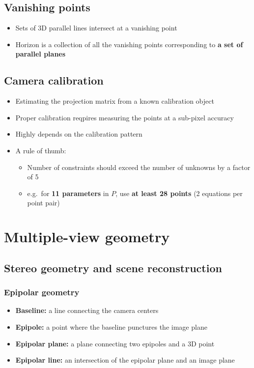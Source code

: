 \documentclass{article}
\begin{document}
    \subsection{Vanishing points}
    \begin{itemize}
        \item Sets of 3D parallel lines intersect at a vanishing point
        \item Horizon is a collection of all the vanishing points corresponding to \textbf{a set of parallel planes}
    \end{itemize}

    \subsection{Camera calibration}
    \begin{itemize}
        \item Estimating the projection matrix from a known calibration object
        \item Proper calibration reqpires measuring the points at a sub-pixel accuracy
        \item Highly depends on the calibration pattern
        \item A rule of thumb:
        \begin{itemize}
            \item Number of constraints should exceed the number of unknowns by a factor of 5
            \item e.g.\ for \textbf{11 parameters} in $P$, use \textbf{at least 28 points} (2 equations per point pair)
        \end{itemize}
    \end{itemize}

    \newpage

\section{Multiple-view geometry}

    \subsection{Stereo geometry and scene reconstruction}

        \subsubsection{Epipolar geometry}
        \begin{itemize}
            \item \textbf{Baseline:} a line connecting the camera centers
            \item \textbf{Epipole:} a point where the baseline punctures the image plane
            \item \textbf{Epipolar plane:} a plane connecting two epipoles and a 3D point
            \item \textbf{Epipolar line:} an intersection of the epipolar plane and an image plane
        \end{itemize}
\end{document}
